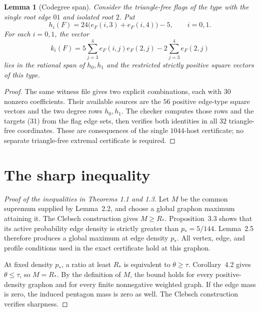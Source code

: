 \documentclass[11pt]{amsart}
\newtheorem{lemma}[theorem]{Lemma}
\theoremstyle{definition}
\theoremstyle{remark}
\begin{document}
\begin{lemma}[Codegree span]\label{lem:codegree-span}
Consider the triangle-free flags of the type with the single root edge
\(01\) and isolated root \(2\). Put
\[
 h_i(F)=24\bigl(e_F(i,3)+e_F(i,4)\bigr)-5,\qquad i=0,1.
\]
For each \(i=0,1\), the vector
\begin{equation}
 k_i(F)=5\sum_{j=3}^4e_F(i,j)e_F(2,j)
                 -2\sum_{j=3}^4e_F(2,j)\tag{31}
\end{equation}
lies in the rational span of \(h_0,h_1\) and the restricted strictly
positive square vectors of this type.
\end{lemma}
\begin{proof}
The same witness file gives two explicit combinations, each with \(30\)
nonzero coefficients. Their available sources are the \(56\) positive
edge-type square vectors and the two degree rows \(h_0,h_1\). The checker
computes those rows and the targets (31) from the flag edge sets,
then verifies both identities in all \(32\) triangle-free coordinates.
These are consequences of the single \(1044\)-host certificate; no
separate triangle-free extremal certificate is required.
\end{proof}

\section{The sharp inequality}

\begin{proof}[Proof of the inequalities in Theorems 1.1 and 1.3]
Let \(M\) be the common supremum supplied by Lemma~2.2, and choose a
global graphon maximum attaining it. The Clebsch construction gives
\(M\ge R_*\). Proposition~3.3 shows that its active probability edge
density is strictly greater than \(p_*=5/144\). Lemma~2.5 therefore
produces a global maximum at edge density \(p_*\). All vertex, edge, and
profile conditions used in the exact certificate hold at this graphon.

At fixed density \(p_*\), a ratio at least \(R_*\) is equivalent to
\(\theta\ge\tau\). Corollary~4.2 gives \(\theta\le\tau\), so \(M=R_*\).
By the definition of \(M\), the bound holds for every positive-density
graphon and for every finite nonnegative weighted graph. If the edge mass
is zero, the induced pentagon mass is zero as well. The Clebsch
construction verifies sharpness.
\end{proof}

\end{document}
